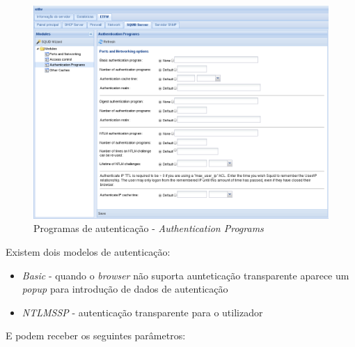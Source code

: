 \begin{figure}[H]
    \begin{center}
    \includegraphics[scale=0.38]{screenshots/etfw/etfw_squid_authenticationprograms_01.png}
    \caption{Programas de autenticação - \textit{Authentication Programs}}
    \label{fig:etfw_squid_authenticationprograms_01}
    \end{center}
\end{figure}

Existem dois modelos de autenticação:

\begin{itemize}
    \item \textit{Basic} - quando o \textit{browser} não suporta aunteticação transparente aparece um \textit{popup} para introdução de dados de autenticação
    \item \textit{NTLMSSP} - autenticação transparente para o utilizador
\end{itemize}

E podem receber os seguintes parâmetros:

